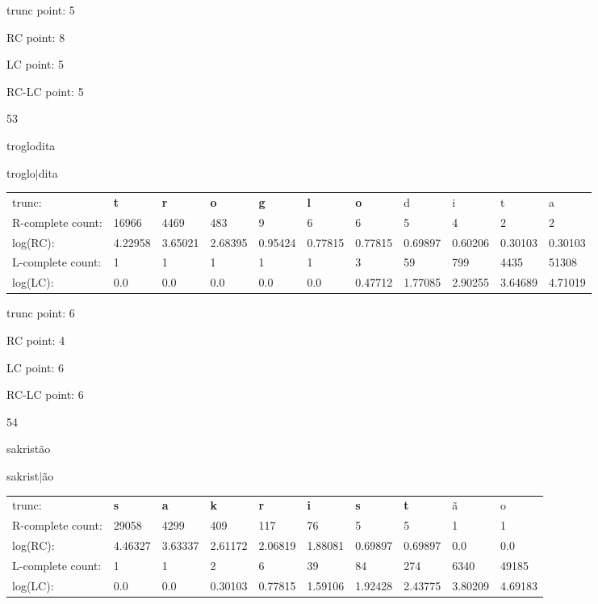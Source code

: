 \documentclass{article}
\begin{document}
trunc point: 5

RC point: 8

LC point: 5

RC-LC point: 5

\vspace{3em}



53

troglodita

troglo$|$dita

\vspace{1em}

\begin{tabular}{l|llllllllll}

trunc: & {\color{red}\bf t} & {\color{red}\bf r} & {\color{red}\bf o} & {\color{red}\bf g} & {\color{red}\bf l} & {\color{red}\bf o} & d & i & t & a \\ 
R-complete count: & 16966 & 4469 & 483 & 9 & 6 & 6 & 5 & 4 & 2 & 2 \\ 
log(RC): & 4.22958 & 3.65021 & 2.68395 & 0.95424 & 0.77815 & 0.77815 & 0.69897 & 0.60206 & 0.30103 & 0.30103 \\ 
L-complete count: & 1 & 1 & 1 & 1 & 1 & 3 & 59 & 799 & 4435 & 51308 \\ 
log(LC): & 0.0 & 0.0 & 0.0 & 0.0 & 0.0 & 0.47712 & 1.77085 & 2.90255 & 3.64689 & 4.71019 \\ 
\end{tabular}

trunc point: 6

RC point: 4

LC point: 6

RC-LC point: 6

\vspace{3em}



54

sakristão

sakrist$|$ão

\vspace{1em}

\begin{tabular}{l|lllllllll}

trunc: & {\color{red}\bf s} & {\color{red}\bf a} & {\color{red}\bf k} & {\color{red}\bf r} & {\color{red}\bf i} & {\color{red}\bf s} & {\color{red}\bf t} & ã & o \\ 
R-complete count: & 29058 & 4299 & 409 & 117 & 76 & 5 & 5 & 1 & 1 \\ 
log(RC): & 4.46327 & 3.63337 & 2.61172 & 2.06819 & 1.88081 & 0.69897 & 0.69897 & 0.0 & 0.0 \\ 
L-complete count: & 1 & 1 & 2 & 6 & 39 & 84 & 274 & 6340 & 49185 \\ 
log(LC): & 0.0 & 0.0 & 0.30103 & 0.77815 & 1.59106 & 1.92428 & 2.43775 & 3.80209 & 4.69183 \\ 
\end{tabular}
\end{document}
